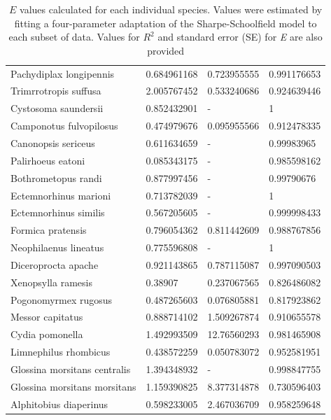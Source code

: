 \documentclass{article}
\begin{document}
\begin{table}[h]
\begin{tabular}{llll}
Pachydiplax longipennis         & 0.684961168 & 0.723955555 & 0.991176653 \\
Trimrrotropis suffusa           & 2.005767452 & 0.533240686 & 0.924639446 \\
Cystosoma saundersii            & 0.852432901 & -           & 1           \\
Camponotus fulvopilosus         & 0.474979676 & 0.095955566 & 0.912478335 \\
Canonopsis sericeus             & 0.611634659 & -           & 0.99983965  \\
Palirhoeus eatoni               & 0.085343175 & -           & 0.985598162 \\
Bothrometopus randi             & 0.877997456 & -           & 0.99790676  \\
Ectemnorhinus marioni           & 0.713782039 & -           & 1           \\
Ectemnorhinus similis           & 0.567205605 & -           & 0.999998433 \\
Formica pratensis               & 0.796054362 & 0.811442609 & 0.988767856 \\
Neophilaenus lineatus           & 0.775596808 & -           & 1           \\
Diceroprocta apache             & 0.921143865 & 0.787115087 & 0.997090503 \\
Xenopsylla ramesis              & 0.38907     & 0.237067565 & 0.826486082 \\
Pogonomyrmex rugosus            & 0.487265603 & 0.076805881 & 0.817923862 \\
Messor capitatus                & 0.888714102 & 1.509267874 & 0.910655578 \\
Cydia pomonella                 & 1.492993509 & 12.76560293 & 0.981465908 \\
Limnephilus rhombicus           & 0.438572259 & 0.050783072 & 0.952581951 \\
Glossina morsitans centralis    & 1.394348932 & -           & 0.998847755 \\
Glossina morsitans morsitans    & 1.159390825 & 8.377314878 & 0.730596403 \\
Alphitobius diaperinus          & 0.598233005 & 2.467036709 & 0.958259648
\end{tabular}

\caption{\label{Table:S3} \emph{$E$} values calculated for each individual species. Values were estimated by fitting a four-parameter adaptation of the Sharpe-Schoolfield model \citep{kontopoulos2020adaptive} to each subset of data. Values for $R^2$ and standard error (SE) for \emph{E} are also provided}
\end{table}
\clearpage
\end{document}
